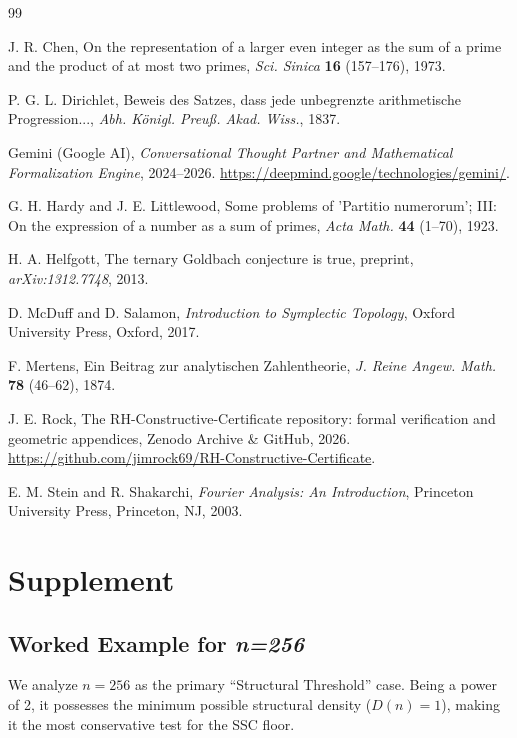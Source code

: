 \documentclass[twoside,9pt]{extarticle}
\begin{document}
\begin{thebibliography}{99}
{
J. R. Chen, On the representation of a larger even integer as the sum of a prime and the product of at most two primes, \textit{Sci. Sinica} \textbf{16} (157--176), 1973.

P. G. L. Dirichlet, Beweis des Satzes, dass jede unbegrenzte arithmetische Progression..., \textit{Abh. Königl. Preuß. Akad. Wiss.}, 1837.

Gemini (Google AI), \textit{Conversational Thought Partner and Mathematical Formalization Engine}, 2024--2026. \url{https://deepmind.google/technologies/gemini/}.

G. H. Hardy and J. E. Littlewood, Some problems of 'Partitio numerorum'; III: On the expression of a number as a sum of primes, \textit{Acta Math.} \textbf{44} (1--70), 1923.

H. A. Helfgott, The ternary Goldbach conjecture is true, preprint, \textit{arXiv:1312.7748}, 2013.

D. McDuff and D. Salamon, \textit{Introduction to Symplectic Topology}, Oxford University Press, Oxford, 2017.

F. Mertens, Ein Beitrag zur analytischen Zahlentheorie, \textit{J. Reine Angew. Math.} \textbf{78} (46--62), 1874.

J. E. Rock, The RH-Constructive-Certificate repository: formal verification and geometric appendices, Zenodo Archive \& GitHub, 2026. \url{https://github.com/jimrock69/RH-Constructive-Certificate}.

E. M. Stein and R. Shakarchi, \textit{Fourier Analysis: An Introduction}, Princeton University Press, Princeton, NJ, 2003.
}
\end{thebibliography}

\section*{Supplement}
\subsection*{Worked Example for \textit{n=256}}

We analyze $n=256$ as the primary ``Structural Threshold'' case. Being a power of 2, it possesses the minimum possible structural density ($D(n)=1$), making it the most conservative test for the SSC floor.
\end{document}
